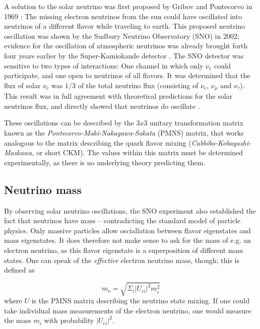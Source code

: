 \documentclass[
    a4paper, %
    fontsize=10pt, %
    twoside=false, %
    numbers=noenddot, %
    fontmethod=tex,
]{kaobook}
\begin{document}
A solution to the solar neutrino was first proposed by Gribov and Pontecorvo in 1969 : The missing electron neutrinos from the sun could have oscillated into neutrinos of a different flavor while traveling to earth. This proposed neutrino oscillation was shown by the Sudbury Neutrino Observatory (SNO) in 2002; evidence for the oscillation of atmospheric neutrinos was already brought forth four years earlier by the Super-Kamiokande detector . The SNO detector was sensitive to two types of interactions: One channel in which only $\nu_e$ could participate, and one open to neutrinos of all flavors. It was determined that the flux of solar $\nu_e$  was $1/3$ of the total neutrino flux (consisting of $\nu_e$, $\nu_\mu$ and $\nu_\tau$). This result was in full agreement with theoretical predictions for the solar neutrinos flux, and directly showed that neutrinos do oscillate .

These oscillations can be described by the $3x3$ unitary transformation matrix known as the \textit{Pontecorvo-Maki-Nakagawa-Sakata} (PMNS) matrix, that works analogous to the matrix describing the quark flavor mixing (\textit{Cabbibo-Kobayashi-Maskawa}, or short CKM). The values within this matrix must be determined experimentally, as there is no underlying theory predicting them.

\subsection{Neutrino mass}
By observing solar neutrino oscillations, the SNO experiment also established the fact that neutrinos have mass -- contradicting the standard model of particle physics. Only massive particles allow osciallation between flavor eigenstates and mass eigenstates. It does therefore not make sense to ask for the mass of e.g. an electron neutrino, as this flavor eigenstate is a superposition of different mass states. One can speak of the \textit{effective} electron neutrino mass, though; this is defined as

\begin{equation}
m_\nu = \sqrt{ \Sigma_i |U_{ei}|^2 m_i^2 }
\end{equation}
where $U$ is the PMNS matrix describing the neutrino state mixing. If one could take individual mass measurements of the electron neutrino, one would measure the mass $m_i$ with probability $|U_{ei}|^2$.
\end{document}
